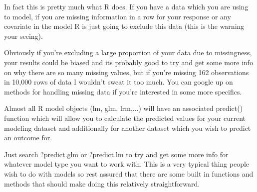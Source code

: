 \documentclass[00-GLMregslides.tex]{subfiles}
\begin{document}
\begin{frame}
	In fact this is pretty much what R does. If you have a data which you are using to model, if you are missing information in a row for your response or any covariate in the model R is just going to exclude this data (this is the warning your seeing). 
\end{frame}
\begin{frame}
Obviously if you're excluding a large proportion of your data due to missingness, your results could be biased and its probably good to try and get some more info on why there are so many missing values, but if you're missing 162 observations in 10,000 rows of data I wouldn't sweat it too much. You can google up on methods for handling missing data if you're interested in some more specifics.
\end{frame}
\begin{frame}
Almost all R model objects (lm, glm, lrm,...) will have an associated predict() function which will allow you to calculate the predicted values for your current modeling dataset and additionally for another dataset which you wish to predict an outcome for. 

\end{frame}
\begin{frame}
Just search ?predict.glm or ?predict.lm to try and get some more info for whatever model type you want to work with. This is a very typical thing people wish to do with models so rest assured that there are some built in functions and methods that should make doing this relatively straightforward.

\end{frame}
	

\end{document}
